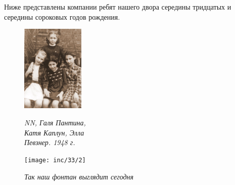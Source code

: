 \indent

Ниже представлены компании ребят нашего двора середины тридцатых и середины сороковых годов рождения.

\begin{figure}[h!]
    \noindent
    \begin{minipage}[t][65mm]{45mm}
        \includegraphics[width=30mm]{inc/33/1}
        
        \begin{footnotesize}\textit{NN, Галя Пантина, \\ Катя Каплун, Элла \\ Певзнер. 1948 г.}\end{footnotesize}
    \end{minipage}
    \hfill
    \begin{minipage}[t][65mm]{61mm}
        \texttt{[image: inc/33/2]} \begin{footnotesize}\textit{Так наш фонтан выглядит сегодня}\end{footnotesize}
    \end{minipage}
\end{figure}

\vspace{-20pt}

\begin{figure}[h!]
    

\end{figure}

